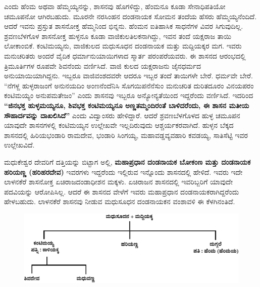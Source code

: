 ಎಂದು ಹೆಂಮ ಅಥವಾ ಹೆಮ್ಮಯ್ಯನನ್ನು, ಶಾಸನವು ಹೊಗಳಿದ್ದು, ಹೆಂಮನೂ ಕೂಡಾ ಸೇನಾಧಿಪತಿಯೋ ಚಮೂಪನೋ ಆಗಿರಬಹುದು. ಮೂರನೇ ನರಸಿಂಹನ ದಂಡನಾಯಕ ಸೋಮನ ತಂದೆಯ ಹೆಸರು ಹೆಮ್ಮಯ್ಯನೆಂದಿದೆ. ಆದರೆ ಇವನು ಪ್ರಸ್ತುತ ಶಾಸನೋಕ್ತ ಹೆಮ್ಮನಿಂದ ಭಿನ್ನನು. ಹೆಂಮನ ಐತಿಹಾಸಿಕ ಸಾಧನೆಗಳ ವಿವರ ಸಿಗುವುದಿಲ್ಲ. ಶ್ರವಣಬೆಳಗೊಳ ಶಾಸನೋಕ್ತ ಹುಳ್ಳನೂ ಕೂಡಾ ವಾಜಿಕುಲತಿಲಕನಾಗಿದ್ದು, ಇವನ ತಂದೆ ಯಕ್ಷರಾಜ ತಾಯಿ ಲೋಕಾಂಬಿಕೆ. ಕಂಟಿಮಯ್ಯನು, ವಾಜಿಕುಲದ ಮಧುಸೂಧನ ದಂಡನಾಯಕ ಮತ್ತು ಮದ್ದಿಯಕ್ಕರ ಮಗ. ಇವರು ಮನುಚರಿತರು ಅಂದರೆ ವೈದಿಕ ಧರ್ಮಾನುಯಾಯಿಗಳಾದ ಸ್ಮಾರ್ತ ಪರಂಪರೆಯವರು. ಈ ಶಾಸನದ ಆರಂಭದಲ್ಲಿ ತ್ರಿಮೂರ್ತಿಗಳ ರೂಪವೇ ಶಿವನೆಂದು ವರ್ಣಿಸಿದೆ. ವಾಜಿ ಕುಲದ ಯಕ್ಷರಾಜನು ಜೈನಧರ್ಮದ ಅನುಯಾಯಿಯಾಗಿದ್ದನು. ಇಬ್ಬರೂ ವಾಜಿವಂಶದವರೇ ಆದರೂ ಇಬ್ಬರ ತಂದೆ ತಾಯಿಗಳೇ ಬೇರೆ. ಧರ್ಮವೇ ಬೇರೆ. “ನೆಗಳ್ದ ಹುಳ್ಳರಾಜಂಗೆ ಅನುನಯದಿಂ ಅಂಣನೆಂದೆನಿಸಿ ಸೊಗಯಿಪನೆನೆಸುಂ ಮನುಚರಿತ ದುರಿತದೂರಂ ವಿನಯಪರಂ ಕಂಟಿಮಯ್ಯಂ ಅನುಪಮತೇಜಂ” ಎಂದು ಶಾಸನವು ಇಬ್ಬರೂ ಅನ್ಯೋನ್ಯತೆಯಿಂದ ಇದ್ದರೆಂದು ವರ್ಣಿಸಿದೆ. ಇದರಿಂದ \textbf{“ಜಿನಭಕ್ತ ಹುಳ್ಳಮಯ್ಯನೂ, ಶಿವಭಕ್ತ ಕಂಟಿಮಯ್ಯನೂ ಅಣ್ಣತಮ್ಮಂದಿರಂತೆ ಬಾಳಿದರೆಂದು, ಈ ಶಾಸನ ಮತೀಯ ಸೌಹಾರ್ದವನ್ನು ದಾಖಲಿಸಿದೆ”} ಎಂದು ವಿದ್ವಾಂಸರು ಹೇಳಿದ್ದಾರೆ. ಆದರೆ ಶ್ರವಣಬೆಳಗೊಳದ ಹುಳ್ಳ ಚಮೂಪನ ಯಾವುದೇ ಶಾಸನಗಳಲ್ಲಿ ಕಂಟಿಮಯ್ಯನ ಉಲ್ಲೇಖವೇ ಇಲ್ಲದಿರುವುದು ಆಶ್ಚರ್ಯಕರವಾಗಿದೆ. ಹುಳ್ಳನ ಬೆಕ್ಕದ ಶಾಸನದಲ್ಲಿ ಹಿರಿಯಭಂಡಾರಿ ರಾಮದೇವ, ಭಂಡಾರಿ ಸಿಂಗಯ್ಯ, ಮಹಾವಡ್ಡವ್ಯವಹಾರಿ ಕವಡಯ್ಯ, ಸಾತಿಸೆಟ್ಟಿ ಇವರ ಉಲ್ಲೇಖವಿದೆ.

ಮಧುಕೇಶ್ವರ ದೇವರಿಗೆ ದತ್ತಿಯನ್ನು ಬಿಟ್ಟಾಗ ಅಲ್ಲಿ, \textbf{ಮಹಾಪ್ರಧಾನ ದಂಡನಾಯಕ ಬೋಕಂಣ ಮತ್ತು ದಂಡನಾಯಕ ಹರಿಯಣ್ಣ (ಹರಿಹರದೇವ) }ಇವರಗಳು ಇದ್ದರೆಂದು ಇಲ್ಲಿರುವ ಇನ್ನೊಂದು ಶಾಸನದಲ್ಲಿ ಹೇಳಿದೆ. ಇವರು ಇದೇ ಲಾಳನಕೆರೆ ಶಾಸನೋಕ್ತ ಏಚಿರಾಜದಂಡಾಧೀಶನ ಮಕ್ಕಳು. ಏಚಿರಾಜನ ಶಾಸನದಲ್ಲಿ ಇವರಿಬ್ಬರಿಗೆ ಯಾವುದೇ ಪದವಿಯನ್ನು ಆರೋಪಿಸಿಲ್ಲ. ಆದರೆ ಈ ಶಾಸನದ ವೇಳೆಗೆ ಇವರು ಮಹಾಪ್ರಧಾನ ದಂಡನಾಯಕರಾಗಿದ್ದರೆಂದು ಹೇಳಬಹುದು. ಲಾಳನಕೆರೆ ಶಾಸನವು ನೀಡುವ ಮಧುಸೂಧನ ದಂಡನಾಯಕನ ವಂಶಾವಳಿ ಈ ಕೆಳಗಿನಂತಿದೆ.

\begin{figure}[H]
\includegraphics[scale=1.17]{images/chap3/chap3fig27.jpeg}
\end{figure}

